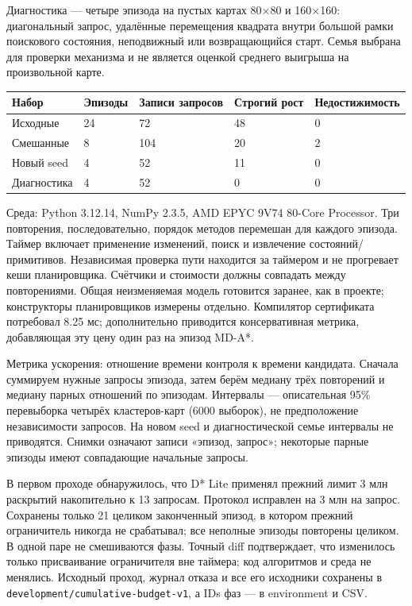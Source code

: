 \documentclass[
  10pt,
]{article}
\begin{document}
Диагностика --- четыре эпизода на пустых картах 80×80 и 160×160:
диагональный запрос, удалённые перемещения квадрата внутри большой рамки
поискового состояния, неподвижный или возвращающийся старт. Семья
выбрана для проверки механизма и не является оценкой среднего выигрыша
на произвольной карте.

\begin{longtable}[]{@{}lllll@{}}
\toprule\noalign{}
Набор & Эпизоды & Записи запросов & Строгий рост & Недостижимость \\
\midrule\noalign{}
\endhead
\bottomrule\noalign{}
\endlastfoot
Исходные & 24 & 72 & 48 & 0 \\
Смешанные & 8 & 104 & 20 & 2 \\
Новый seed & 4 & 52 & 11 & 0 \\
Диагностика & 4 & 52 & 0 & 0 \\
\end{longtable}

Среда: Python 3.12.14, NumPy 2.3.5, AMD EPYC 9V74 80-Core Processor. Три
повторения, последовательно, порядок методов перемешан для каждого
эпизода. Таймер включает применение изменений, поиск и извлечение
состояний/примитивов. Независимая проверка пути находится за таймером и
не прогревает кеши планировщика. Счётчики и стоимости должны совпадать
между повторениями. Общая неизменяемая модель готовится заранее, как в
проекте; конструкторы планировщиков измерены отдельно. Компилятор
сертификата потребовал 8.25 мс; дополнительно приводится консервативная
метрика, добавляющая эту цену один раз на эпизод MD-A*.

Метрика ускорения: отношение времени контроля к времени кандидата.
Сначала суммируем нужные запросы эпизода, затем берём медиану трёх
повторений и медиану парных отношений по эпизодам. Интервалы ---
описательная 95\% перевыборка четырёх кластеров-карт (6000 выборок), не
предположение независимости запросов. На новом seed и диагностической
семье интервалы не приводятся. Снимки означают записи «эпизод, запрос»;
некоторые парные эпизоды имеют совпадающие начальные запросы.

В первом проходе обнаружилось, что D* Lite применял прежний лимит 3 млн
раскрытий накопительно к 13 запросам. Протокол исправлен на 3 млн на
запрос. Сохранены только 21 целиком законченный эпизод, в котором
прежний ограничитель никогда не срабатывал; все неполные эпизоды
повторены целиком. В одной паре не смешиваются фазы. Точный diff
подтверждает, что изменилось только присваивание ограничителя вне
таймера; код алгоритмов и среда не менялись. Исходный проход, журнал
отказа и все его исходники сохранены в
\texttt{development/cumulative-budget-v1}, а IDs фаз --- в environment и
CSV.
\end{document}
